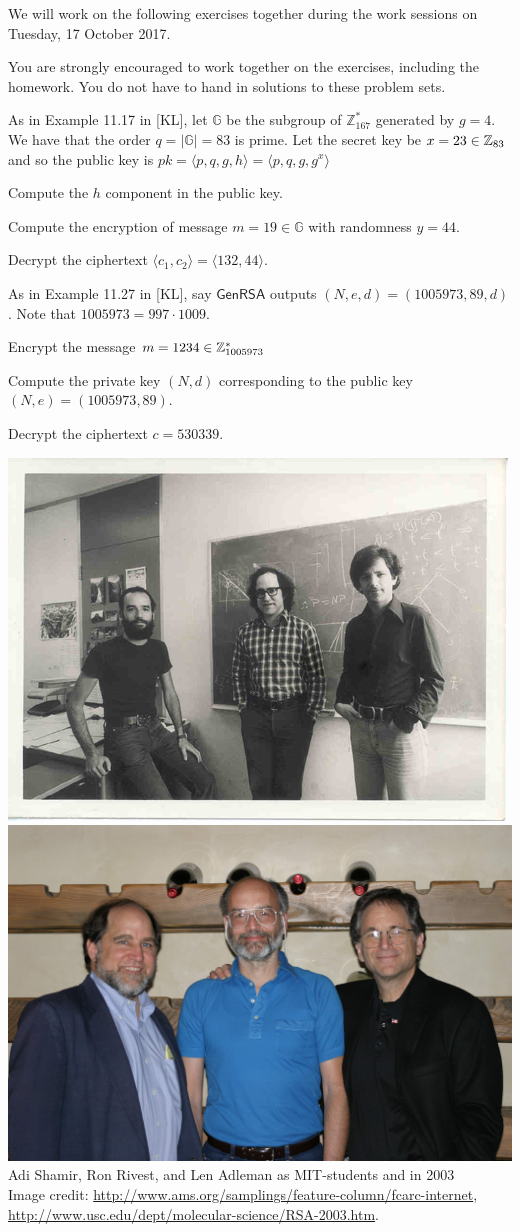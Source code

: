 \documentclass[a4paper,10pt,landscape,twocolumn]{scrartcl}
\newcommand\worksession{Tuesday, 17 October 2017}
\begin{document}
\problems

{\sffamily\noindent
We will work on the following exercises together during the work sessions on \worksession.

You are strongly encouraged to work together on the exercises, including the homework. You do not have to hand in solutions to these problem sets.}


\begin{exercise}
As in Example 11.17 in [KL], let $\mathbb{G}$ be the subgroup of $\mathbb{Z}_{167}^*$ generated by $g=4$. We have that the order $q=|\mathbb{G}|=83$ is prime. Let the secret key be $x=23 \in \mathbb{Z}_{83}$ and so the public key is $pk = \langle p,q,g,h \rangle = \langle p,q,g,g^x \rangle$ 
\begin{subex}
Compute the $h$ component in the public key.
\end{subex}
\begin{subex}
Compute the encryption of message $m=19 \in \mathbb{G}$ with randomness $y=44$.
\end{subex}
\begin{subex}
Decrypt the ciphertext $\langle c_1,c_2 \rangle = \langle 132,44 \rangle$.
\end{subex}
\end{exercise}


\begin{exercise}
As in Example 11.27 in [KL], say $\mathsf{GenRSA}$ outputs $(N,e,d)=(1005973,89,d)$. Note that $1005973=997 \cdot 1009$.
\begin{subex}
Encrypt the message $m=1234 \in \mathbb{Z}_{1005973}^*$
\end{subex}
\begin{subex}
Compute the private key $(N,d)$ corresponding to the public key $(N,e)=(1005973,89)$.
\end{subex}
\begin{subex}
Decrypt the ciphertext $c=530339$.
\end{subex}
\end{exercise}

{
\centering
\includegraphics[height=0.15\textwidth]{RSA-MIT.jpg} \includegraphics[height=0.15\textwidth]{RSA-2003.jpg} \\
Adi Shamir, Ron Rivest, and Len Adleman as MIT-students and in 2003\\
{\small Image credit: \url{http://www.ams.org/samplings/feature-column/fcarc-internet}, \url{http://www.usc.edu/dept/molecular-science/RSA-2003.htm}}.\\
}
\end{document}
